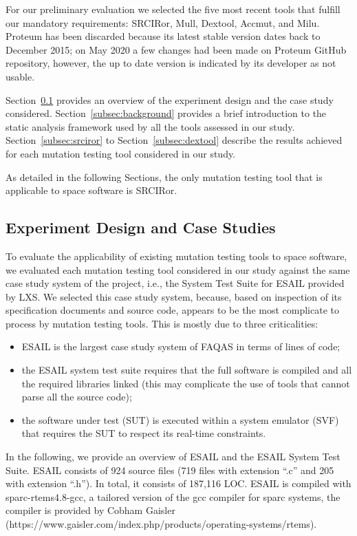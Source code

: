 For our preliminary evaluation we selected the five most recent tools that fulfill our mandatory requirements: SRCIRor, Mull, Dextool, Accmut, and Milu. Proteum has been discarded because its latest stable version dates back to December 2015; on May 2020 a few changes had been made on Proteum GitHub repository, however, the up to date version is indicated by its developer as not usable.

Section~\ref{subsec:experiment_design} provides an overview of the experiment design and the case study considered. 
Section~\ref{subsec:background} provides a brief introduction to the static analysis framework used by all the tools assessed in our study.
Section~\ref{subsec:srciror} to Section~\ref{subsec:dextool} describe the results achieved for each mutation testing tool considered in our study.

As detailed in the following Sections, the only mutation testing tool that is applicable to space software is SRCIRor.

\subsection{Experiment Design and Case Studies}
\label{subsec:experiment_design}




To evaluate the applicability of existing mutation testing tools to space software, we evaluated each mutation testing tool considered in our study against the same case study system of the project, i.e., the System Test Suite for ESAIL provided by LXS. We selected this case study system, because, based on inspection of its specification documents and source code, appears to be the most complicate to process by mutation testing tools. This is mostly due to three criticalities:

\begin{itemize}
	\item ESAIL is the largest case study system of FAQAS in terms of lines of code;
	\item the ESAIL system test suite requires that the full software is compiled and all the required libraries linked (this may complicate the use of tools that cannot parse all the source code);
	\item the software under test (SUT) is executed within a system emulator (SVF) that requires the SUT to respect its real-time constraints.
\end{itemize}

In the following, we provide an overview of ESAIL and the ESAIL System Test Suite. ESAIL consists of 924 source files (719 files with extension ``.c'' and 205 with extension ``.h''). In total, it consists of 187,116 LOC. ESAIL is compiled with sparc-rtems4.8-gcc, a tailored version of the gcc compiler for sparc systems, the compiler is provided by Cobham Gaisler (https://www.gaisler.com/index.php/products/operating-systems/rtems).


